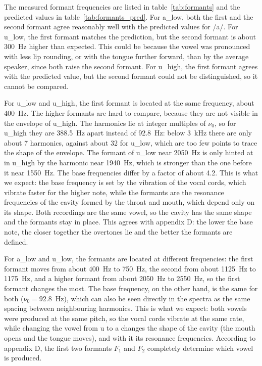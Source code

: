 The measured formant frequencies are listed in table~\ref{tab:formants} and the predicted values in table~\ref{tab:formants_pred}. For a\_low, both the first and the second formant agree reasonably well with the predicted values for /a/. For u\_low, the first formant matches the prediction, but the second formant is about 300~Hz higher than expected. This could be because the vowel was pronounced with less lip rounding, or with the tongue further forward, than by the average speaker, since both raise the second formant. For u\_high, the first formant agrees with the predicted value, but the second formant could not be distinguished, so it cannot be compared.

For u\_low and u\_high, the first formant is located at the same frequency, about 400~Hz. The higher formants are hard to compare, because they are not visible in the envelope of u\_high. The harmonics lie at integer multiples of $\nu_0$, so for u\_high they are 388.5~Hz apart instead of 92.8~Hz: below 3~kHz there are only about 7 harmonics, against about 32 for u\_low, which are too few points to trace the shape of the envelope. The formant of u\_low near 2050~Hz is only hinted at in u\_high by the harmonic near 1940~Hz, which is stronger than the one before it near 1550~Hz. The base frequencies differ by a factor of about 4.2. This is what we expect: the base frequency is set by the vibration of the vocal cords, which vibrate faster for the higher note, while the formants are the resonance frequencies of the cavity formed by the throat and mouth, which depend only on its shape. Both recordings are the same vowel, so the cavity has the same shape and the formants stay in place. This agrees with appendix D: the lower the base note, the closer together the overtones lie and the better the formants are defined.

For a\_low and u\_low, the formants are located at different frequencies: the first formant moves from about 400~Hz to 750~Hz, the second from about 1125~Hz to 1175~Hz, and a higher formant from about 2050~Hz to 2550~Hz, so the first formant changes the most. The base frequency, on the other hand, is the same for both ($\nu_0 = 92.8$~Hz), which can also be seen directly in the spectra as the same spacing between neighbouring harmonics. This is what we expect: both vowels were produced at the same pitch, so the vocal cords vibrate at the same rate, while changing the vowel from u to a changes the shape of the cavity (the mouth opens and the tongue moves), and with it its resonance frequencies. According to appendix D, the first two formants $F_1$ and $F_2$ completely determine which vowel is produced.

